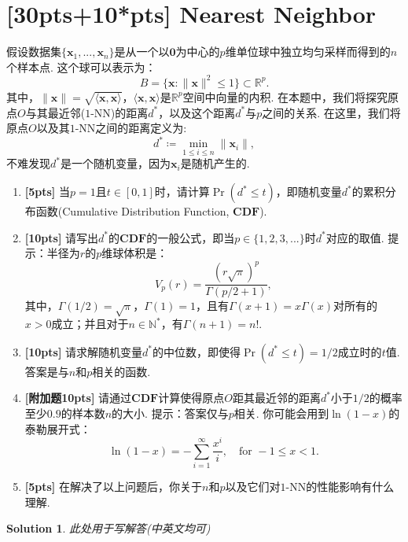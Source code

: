 \documentclass[a4paper,UTF8]{article}
\numberwithin{equation}{section}
\newtheorem*{mySol}{Solution}
\begin{document}
\section{[30pts+10*pts] Nearest Neighbor}
假设数据集$\{\mathbf{x}_1,...,\mathbf{x}_n\}$是从一个以$\mathbf{0}$为中心的$p$维单位球中独立均匀采样而得到的$n$个样本点. 这个球可以表示为：
\begin{equation}
	B = \{\mathbf{x}: \lVert \mathbf{x} \rVert^2 \leq 1\} \subset \mathbb{R}^p.
\end{equation}
其中，$\lVert \mathbf{x} \rVert= \sqrt{\langle\mathbf{x}, \mathbf{x}\rangle}$，$\langle\mathbf{x}, \mathbf{x}\rangle$是$\mathbb{R}^p$空间中向量的内积.
在本题中，我们将探究原点$O$与其最近邻($1$-NN)的距离$d^*$，以及这个距离$d^*$与$p$之间的关系. 在这里，我们将原点$O$以及其$1$-NN之间的距离定义为:
\begin{equation}
d^* \coloneqq \min_{1\leq i \leq n} \lVert \mathbf{x}_i \rVert,
\end{equation}
不难发现$d^*$是一个随机变量，因为$\mathbf{x}_i$是随机产生的.
\begin{enumerate}[(1)]
\item \textbf{[5pts]} 当$p=1$且$t\in [0,1]$时，请计算$\Pr(d^*\leq t)$，即随机变量$d^*$的累积分布函数(Cumulative Distribution Function, $\mathbf{CDF}$).
\item \textbf{[10pts]} 请写出$d^*$的$\mathbf{CDF}$的一般公式，即当$p\in\{1,2,3,...\}$时$d^*$对应的取值. 提示：半径为$r$的$p$维球体积是：
	\begin{equation}
	V_p(r)=\frac{(r\sqrt{\pi})^p}{\Gamma(p/2+1)},
	\end{equation}
	其中，$\Gamma(1/2)=\sqrt{\pi}$，$\Gamma(1)=1$，且有$\Gamma(x+1)=x\Gamma(x)$对所有的$x>0$成立；并且对于$n\in\mathbb{N}^*$，有$\Gamma(n+1)=n!$.
\item \textbf{[10pts]} 请求解随机变量$d^*$的中位数，即使得$\Pr(d^*\leq t)=1/2$成立时的$t$值. 答案是与$n$和$p$相关的函数.

\item \textbf{[附加题10pts]} 请通过$\mathbf{CDF}$计算使得原点$O$距其最近邻的距离$d^*$小于$1/2$的概率至少$0.9$的样本数$n$的大小. 提示：答案仅与$p$相关. 你可能会用到$\ln(1-x)$的泰勒展开式：
\begin{equation}
\ln(1-x) = - \sum_{i=1}^{\infty} \frac{x^i}{i}, \quad \mbox{for } -1 \leq x < 1.
\end{equation}
\item \textbf{[5pts]} 在解决了以上问题后，你关于$n$和$p$以及它们对$1$-NN的性能影响有什么理解.
\end{enumerate}
\begin{mySol}
	此处用于写解答(中英文均可)
	~\\
	~\\
	~\\
	~\\
	~\\
	~\\
	~\\
\end{mySol}
\newpage
\end{document}
